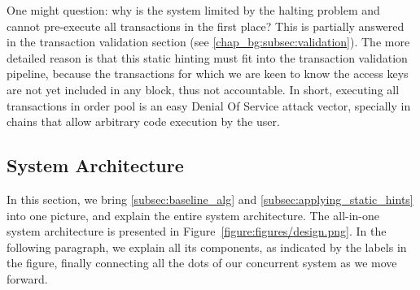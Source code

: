 \begin{remark}
	One might question: why is the system limited by the halting problem and cannot pre-execute all transactions in the first
	place? This is partially answered in the transaction validation section (see
	\ref{chap_bg:subsec:validation}). The more detailed reason is that this static hinting must fit
	into the transaction validation pipeline, because the transactions for which we are keen to know
	the access keys are not yet included in any block, thus not accountable. In short, executing all
	transactions in order pool is an easy Denial Of Service attack vector, specially in chains that
	allow arbitrary code execution by the user.
\end{remark}

\subsection{System Architecture}

In this section, we bring \ref{subsec:baseline_alg} and \ref{subsec:applying_static_hints} into one
picture, and explain the entire system architecture. The all-in-one system architecture is presented
in Figure~\ref{figure:figures/design.png}. In the following paragraph, we explain all its
components, as indicated by the labels in the figure, finally connecting all the dots of our
concurrent system as we move forward.




